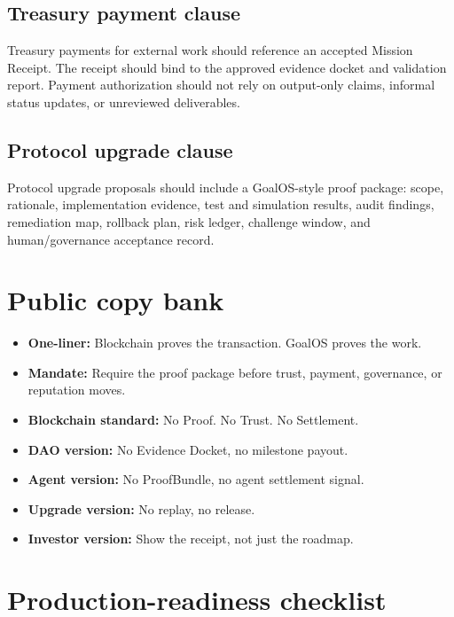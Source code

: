 \subsection{Treasury payment clause}

Treasury payments for external work should reference an accepted Mission Receipt. The receipt should bind to the approved evidence docket and validation report. Payment authorization should not rely on output-only claims, informal status updates, or unreviewed deliverables.

\subsection{Protocol upgrade clause}

Protocol upgrade proposals should include a GoalOS-style proof package: scope, rationale, implementation evidence, test and simulation results, audit findings, remediation map, rollback plan, risk ledger, challenge window, and human/governance acceptance record.

\section{Public copy bank}

\begin{itemize}
  \item \textbf{One-liner:} Blockchain proves the transaction. GoalOS proves the work.
  \item \textbf{Mandate:} Require the proof package before trust, payment, governance, or reputation moves.
  \item \textbf{Blockchain standard:} No Proof. No Trust. No Settlement.
  \item \textbf{DAO version:} No Evidence Docket, no milestone payout.
  \item \textbf{Agent version:} No ProofBundle, no agent settlement signal.
  \item \textbf{Upgrade version:} No replay, no release.
  \item \textbf{Investor version:} Show the receipt, not just the roadmap.
\end{itemize}

\section{Production-readiness checklist}

